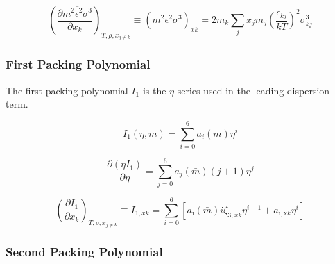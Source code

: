 \documentclass[12pt, letterpaper]{article}
\begin{document}
\begin{equation}
    \left(\frac{\partial\overline{m^{2}\epsilon^{2}\sigma^{3}}}{\partial x_{k}}\right)_{T,\rho,x_{j\neq k}}
    \equiv (\overline{m^2\epsilon^2\sigma^3})_{xk}
    =2m_{k}\sum_{j}x_{j}m_{j}\left(\frac{\epsilon_{kj}}{kT}\right)^2\sigma_{kj}^3
    \label{eq:m2eps2sigma3_xk}
\end{equation}

\subsubsection{First Packing Polynomial}

The first packing polynomial \(I_1\) is the \(\eta\)-series used in the leading dispersion term.

\begin{equation}
    I_{1}(\eta, \bar{m})=\sum_{i=0}^6 a_{i}(\bar{m}) \eta^i
    \label{eq:i1_disp}
\end{equation}


\begin{equation}
    \frac{\partial(\eta I_{1})}{\partial\eta}=\sum_{j=0}^6a_{j}(\bar{m})(j+1)\eta^j
    \label{eq:deta_i1_deta}
\end{equation}


\begin{equation}
    \left(\frac{\partial I_{1}}{\partial x_{k}}\right)_{T,\rho,x_{j\neq k}}
    \equiv I_{1,xk}
    =\sum_{i=0}^{6}[a_{\mathrm{i}}(\bar{m})i\zeta_{3,xk}\eta^{i-1}+a_{\mathrm{i,x}k}\eta^{i}]
    \label{eq:i1_xk}
\end{equation}

\subsubsection{Second Packing Polynomial}
\end{document}

